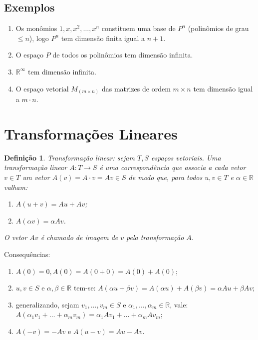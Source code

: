 \documentclass[a4paper,portuguese,9pt]{extarticle}
\newtheorem*{definition}{Definição}
\begin{document}
\begin{multicols*}{2}
\subsection{Exemplos}

\begin{enumerate}
    \item Os monômios $1, x, x^2, \ldots, x^n$ constituem uma base de $P^n$ (polinômios de grau $\leq n$), logo $P^n$ tem dimensão finita igual a $n+1$.
    \item O espaço  $P$  de todos os polinômios tem dimensão infinita. 
    \item $\mathbb{R^{\infty}}$ tem dimensão infinita.
    \item O espaço vetorial $M_{(m \times n)}$ das matrizes de ordem $m \times n$ tem dimensão igual a $m \cdot n$. 
\end{enumerate}

\section{Transformações Lineares}

\begin{definition}
Transformação linear: sejam $T, S$ espaços vetoriais. Uma transformação linear $A: T \rightarrow S$ é uma correspondência que associa a cada vetor $v \in T$ um vetor $A(v)=A \cdot v = Av \in S$ de modo que, para todos $u, v \in T$ e $\alpha \in \mathbb{R}$ valham:
\begin{enumerate}[label=(\roman*)]
    \item $A(u+v)=Au + Av$;
    \item $A(\alpha v)=\alpha Av$.
\end{enumerate}
O vetor $Av$ é chamado de imagem de $v$ pela transformação $A$.
\end{definition}

Consequências:

\begin{enumerate}[label=(\roman*)]
    \item $A(0)=0, A(0)=A(0+0)=A(0)+A(0)$;
    \item $u, v \in S$ e $\alpha, \beta \in \mathbb{R}$ tem-se: $A(\alpha u + \beta v)= A (\alpha u) + A(\beta v) = \alpha Au + \beta Av$;
    \item generalizando, sejam $v_1, \ldots, v_m \in S$ e $\alpha_1, \ldots, \alpha_m \in \mathbb{R}$, vale: $A(\alpha_1 v_1 + \ldots + \alpha_m v_m) = \alpha_1 Av_1 + \ldots + \alpha_m Av_m$;
    \item $A(-v)=-Av$ e $A(u-v)=Au-Av$.
\end{enumerate}


\end{multicols*}
\end{document}
